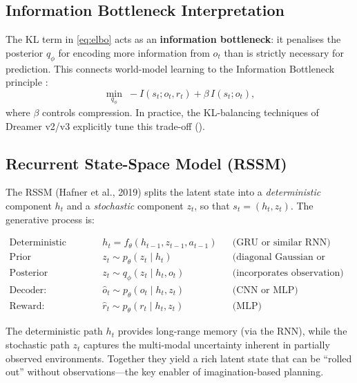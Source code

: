 \documentclass[11pt,a4paper]{article}
\theoremstyle{definition}
\begin{document}
\subsection{Information Bottleneck Interpretation}

The KL term in \eqref{eq:elbo} acts as an \textbf{information
bottleneck}: it penalises the posterior $q_\phi$ for encoding more
information from $o_t$ than is strictly necessary for prediction. This
connects world-model learning to the Information Bottleneck principle
\cite{tishby2000information}:
\begin{equation}
  \min_{q_\phi}\; -I(s_t; o_t, r_t) + \beta\, I(s_t; o_t),
\end{equation}
where $\beta$ controls compression. In practice, the KL-balancing
techniques of Dreamer v2/v3 explicitly tune this trade-off
().

\subsection{Recurrent State-Space Model (RSSM)}\label{sec:rssm}

The RSSM (Hafner et al., 2019) splits the latent state into a
\emph{deterministic} component $h_t$ and a \emph{stochastic} component
$z_t$, so that $s_t = (h_t, z_t)$. The generative process is:

\begin{align}
  \text{Deterministic path:} &\quad h_t = f_\theta(h_{t-1}, z_{t-1}, a_{t-1})
    & &\text{(GRU or similar RNN)} \label{eq:rssm_det}\\
  \text{Prior (transition):} &\quad z_t \sim p_\theta(z_t \mid h_t)
    & &\text{(diagonal Gaussian or categorical)} \label{eq:rssm_prior}\\
  \text{Posterior (encoder):} &\quad z_t \sim q_\phi(z_t \mid h_t, o_t)
    & &\text{(incorporates observation)} \label{eq:rssm_post}\\
  \text{Decoder:} &\quad \hat{o}_t \sim p_\theta(o_t \mid h_t, z_t)
    & &\text{(CNN or MLP)} \label{eq:rssm_dec}\\
  \text{Reward:} &\quad \hat{r}_t \sim p_\theta(r_t \mid h_t, z_t)
    & &\text{(MLP)} \label{eq:rssm_rew}
\end{align}

\begin{keyinsight}
The deterministic path $h_t$ provides long-range memory (via the RNN),
while the stochastic path $z_t$ captures the multi-modal uncertainty
inherent in partially observed environments. Together they yield a rich
latent state that can be ``rolled out'' without observations---the key
enabler of imagination-based planning.
\end{keyinsight}
\end{document}
